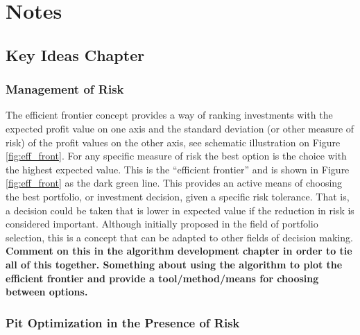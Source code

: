 
\chapter{Notes}
\label{ch:Notes}


\section{Key Ideas Chapter}

    \subsection{Management of Risk}
    The efficient frontier concept provides a way of ranking investments with the expected profit value on one axis and the standard deviation (or other measure of risk) of the profit values on the other axis, see schematic illustration on Figure \ref{fig:eff_front}. For any specific measure of risk the best option is the choice with the highest expected value. This is the ``efficient frontier'' and is shown in Figure \ref{fig:eff_front} as the dark green line. This provides an active means of choosing the best portfolio, or investment decision, given a specific risk tolerance. That is, a decision could be taken that is lower in expected value if the reduction in risk is considered important. Although initially proposed in the field of portfolio selection, this is a concept that can be adapted to other fields of decision making. \textbf{Comment on this in the algorithm development chapter in order to tie all of this together. Something about using the algorithm to plot the efficient frontier and provide a tool/method/means for choosing between options.}

    \subsection{Pit Optimization in the Presence of Risk}

